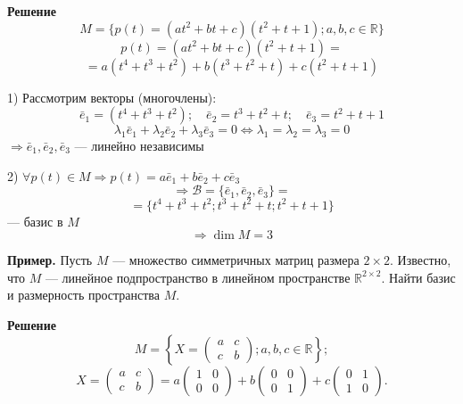 \documentclass[12pt,a4paper]{article}
\newcommand{\ve}{\bar e}
\begin{document}
\textbf{Решение}
$$
M = \{p(t) = (at^2 + bt + c)(t^2 + t + 1); a, b, c \in \mathbb{R}\}
$$
$$
p(t) = (at^2 + bt + c)(t^2 + t + 1) =
$$
$$
= a(t^4 + t^3 + t^2) + b(t^3 + t^2 + t) + c(t^2 + t + 1)
$$

1) Рассмотрим векторы (многочлены):
$$
\ve_1 = (t^4 + t^3 + t^2); \quad \ve_2 = t^3 + t^2 + t; \quad \ve_3 =
t^2 + t + 1
$$
$$
\lambda_1 \ve_1 + \lambda_2 \ve_2 + \lambda_3 \ve_3 = 0
\Leftrightarrow \lambda_1 = \lambda_2 = \lambda_3 = 0
$$
$\Rightarrow \ve_1, \ve_2, \ve_3$ --- линейно независимы

2) $\forall p(t) \in M \Rightarrow p(t) = a \ve_1 + b \ve_2 + c \ve_3$
$$
\Rightarrow \mathcal{B} = \{\ve_1, \ve_2, \ve_3\} =
$$
$$
= \{t^4 + t^3 + t^2; t^3 + t^2 + t; t^2 + t + 1\}
$$
--- базис в $M$
$$
\Rightarrow \dim M = 3
$$

\textbf{Пример.} Пусть $M$ --- множество симметричных матриц размера
$2 \times 2$. Известно, что $M$ --- линейное подпространство в
линейном пространстве $\mathbb{R}^{2\times 2}$. Найти базис и
размерность пространства $M$.

\textbf{Решение}
$$
M = \left\{X =
\begin{pmatrix} a & c \\ c & b
\end{pmatrix}; a, b, c \in \mathbb{R}\right\};
$$
$$
X =
\begin{pmatrix} a & c \\ c & b
\end{pmatrix} = a
\begin{pmatrix} 1 & 0 \\ 0 & 0
\end{pmatrix} + b
\begin{pmatrix} 0 & 0 \\ 0 & 1
\end{pmatrix} + c
\begin{pmatrix} 0 & 1 \\ 1 & 0
\end{pmatrix}.
$$
\end{document}
